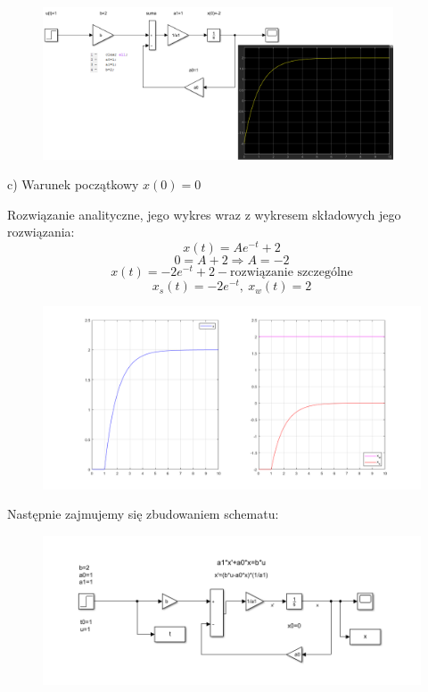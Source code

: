 \documentclass{article}
\begin{document}
\begin{figure}[h!]
    \centering
    \includegraphics[width=0.928\textwidth]{symulacja3B.png}
    \label{fig:my_label}
\end{figure}
\begin{flushleft}
c) Warunek początkowy $x(0)=0$\\

\end{flushleft}
Rozwiązanie analityczne, jego wykres wraz z wykresem składowych jego rozwiązania:\\
$$
x(t)=Ae^{-t}+2
$$
$$
0=A+2 \Rightarrow A=-2
$$
$$
x(t)=-2e^{-t}+2-\text{rozwiązanie szczególne}
$$
$$
x_s(t)=-2e^{-t}, \  x_w(t)=2
$$

\begin{figure}[h!]
    \centering
    \includegraphics[width=\textwidth]{x_0.png}
    \label{fig:my_label}
\end{figure}
Następnie zajmujemy się zbudowaniem schematu:\\
\begin{figure}[h!]
    \centering
    \includegraphics[width=\textwidth]{schemat_0w.png}
    \label{fig:my_label}
\end{figure}
\end{document}
